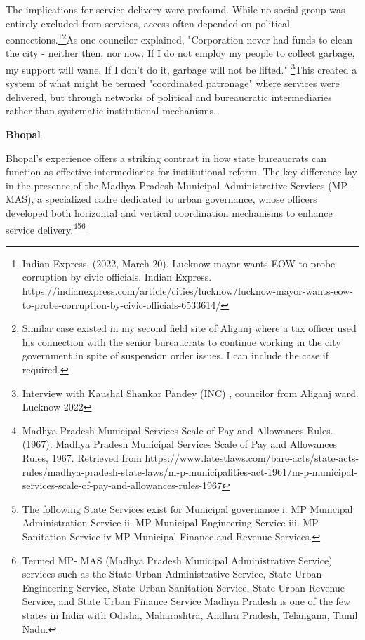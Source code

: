 The implications for service delivery were profound. While no social group was entirely excluded from services, access often depended on political connections.\footnote{Indian Express. (2022, March 20). Lucknow mayor wants EOW to probe corruption by civic officials. Indian Express. https://indianexpress.com/article/cities/lucknow/lucknow-mayor-wants-eow-to-probe-corruption-by-civic-officials-6533614/
}\footnote{Similar case existed in my second field site of Aliganj where a tax officer used his connection with the senior bureaucrats to continue working in the city government in spite of suspension order issues. I can include the case if required. 
}As one councilor explained, "Corporation never had funds to clean the city - neither then, nor now. If I do not employ my people to collect garbage, my support will wane. If I don't do it, garbage will not be lifted." \footnote{Interview with Kaushal Shankar Pandey (INC) , councilor from Aliganj ward. Lucknow 2022}This created a system of what might be termed "coordinated patronage" where services were delivered, but through networks of political and bureaucratic intermediaries rather than systematic institutional mechanisms.

\vspace{5mm}
\textbf{Bhopal}

Bhopal's experience offers a striking contrast in how state bureaucrats can function as effective intermediaries for institutional reform. The key difference lay in the presence of the Madhya Pradesh Municipal Administrative Services (MP-MAS), a specialized cadre dedicated to urban governance, whose officers developed both horizontal and vertical coordination mechanisms to enhance service delivery.\footnote{Madhya Pradesh Municipal Services Scale of Pay and Allowances Rules. (1967). Madhya Pradesh Municipal Services Scale of Pay and Allowances Rules, 1967. Retrieved from https://www.latestlaws.com/bare-acts/state-acts-rules/madhya-pradesh-state-laws/m-p-municipalities-act-1961/m-p-municipal-services-scale-of-pay-and-allowances-rules-1967
}\footnote{The following State Services exist for Municipal governance i. MP Municipal Administration Service  ii. MP Municipal Engineering Service iii. MP Sanitation Service iv MP Municipal Finance and Revenue Services.}\footnote{Termed MP- MAS (Madhya Pradesh Municipal Administrative Service) services such as the State Urban Administrative Service, State Urban Engineering Service, State Urban Sanitation Service, State Urban Revenue Service, and State Urban Finance Service Madhya Pradesh is one of the few states in India with Odisha, Maharashtra, Andhra Pradesh, Telangana, Tamil Nadu.
}

